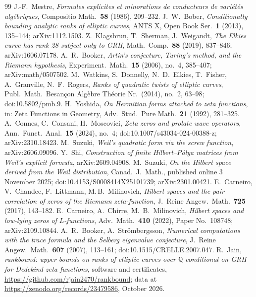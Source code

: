 \documentclass[11pt]{amsart}
\theoremstyle{remark}
\theoremstyle{definition}
\begin{document}
\begin{thebibliography}{99}
 J.-F.~Mestre, \emph{Formules explicites et minorations de conducteurs de vari\'et\'es alg\'ebriques}, Compositio Math.\ \textbf{58} (1986), 209--232.
 J.~W.~Bober, \emph{Conditionally bounding analytic ranks of elliptic curves}, ANTS X, Open Book Ser.\ \textbf{1} (2013), 135--144; arXiv:1112.1503.
 Z.~Klagsbrun, T.~Sherman, J.~Weigandt, \emph{The Elkies curve has rank 28 subject only to GRH}, Math.\ Comp.\ \textbf{88} (2019), 837--846; arXiv:1606.07178.
 A.~R.~Booker, \emph{Artin's conjecture, Turing's method, and the Riemann hypothesis}, Experiment.\ Math.\ \textbf{15} (2006), no.~4, 385--407; arXiv:math/0507502.
 M.~Watkins, S.~Donnelly, N.~D.~Elkies, T.~Fisher, A.~Granville, N.~F.~Rogers, \emph{Ranks of quadratic twists of elliptic curves}, Publ.\ Math.\ Besan\c{c}on Alg\`ebre Th\'eorie Nr.\ (2014), no.~2, 63--98; doi:10.5802/pmb.9.
 H.~Yoshida, \emph{On Hermitian forms attached to zeta functions}, in: Zeta Functions in Geometry, Adv.\ Stud.\ Pure Math.\ \textbf{21} (1992), 281--325.
 A.~Connes, C.~Consani, H.~Moscovici, \emph{Zeta zeros and prolate wave operators}, Ann.\ Funct.\ Anal.\ \textbf{15} (2024), no.~4; doi:10.1007/s43034-024-00388-z; arXiv:2310.18423.
 M.~Suzuki, \emph{Weil's quadratic form via the screw function}, arXiv:2606.09096.
 Y.~Shi, \emph{Construction of finite Hilbert--P\'olya matrices from Weil's explicit formula}, arXiv:2609.04908.
 M.~Suzuki, \emph{On the Hilbert space derived from the Weil distribution}, Canad.\ J.\ Math., published online 3 November 2025; doi:10.4153/S0008414X25101739; arXiv:2301.00421.
 E.~Carneiro, V.~Chandee, F.~Littmann, M.\,B.~Milinovich, \emph{Hilbert spaces and the pair correlation of zeros of the Riemann zeta-function}, J.\ Reine Angew.\ Math.\ \textbf{725} (2017), 143--182.
 E.~Carneiro, A.~Chirre, M.~B.~Milinovich, \emph{Hilbert spaces and low-lying zeros of $L$-functions}, Adv.\ Math.\ \textbf{410} (2022), Paper No.~108748; arXiv:2109.10844.
 A.~R.~Booker, A.~Str\"ombergsson, \emph{Numerical computations with the trace formula and the Selberg eigenvalue conjecture}, J.\ Reine Angew.\ Math.\ \textbf{607} (2007), 113--161; doi:10.1515/CRELLE.2007.047.
 R.~Jain, \emph{rankbound: upper bounds on ranks of elliptic curves over $\mathbb Q$ conditional on GRH for Dedekind zeta functions}, software and certificates, \url{https://github.com/rjain2470/rankbound}; data at \url{https://zenodo.org/records/23479586}, October 2026.

\end{thebibliography}
\end{document}
